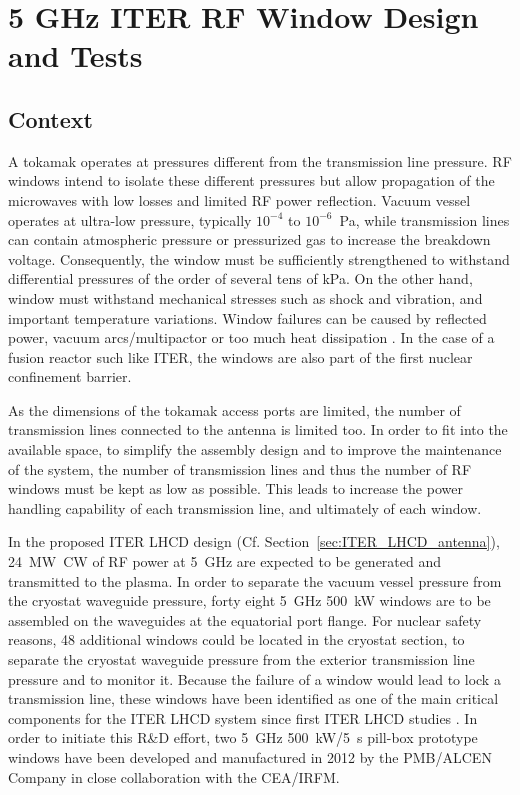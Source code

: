 \clearpage
\section[ITER RF Window]{5 GHz ITER RF Window Design and Tests}\label{sec:RF_windows}
\subsection{Context}
A tokamak operates at pressures different from the transmission line pressure. RF windows intend to isolate these different pressures but allow propagation of the microwaves with low losses and limited RF power reflection. Vacuum vessel operates at ultra-low pressure, typically $10^{-4}$ to $10^{-6}$~\si{Pa}, while transmission lines can contain atmospheric pressure or pressurized gas to increase the breakdown voltage. Consequently, the window must be sufficiently strengthened to withstand differential pressures of the order of several tens of \si{kPa}. On the other hand, window must withstand mechanical stresses such as shock and vibration, and important temperature variations. Window failures can be caused by reflected power, vacuum arcs/multipactor or too much heat dissipation . In the case of a fusion reactor such like ITER, the windows are also part of the first nuclear confinement barrier.

As the dimensions of the tokamak access ports are limited, the number of transmission lines connected to the antenna is limited too. In order to fit into the available space, to simplify the assembly design and to improve the maintenance of the system, the number of transmission lines and thus the number of RF windows must be kept as low as possible. This leads to increase the power handling capability of each transmission line, and ultimately of each window.

In the proposed ITER LHCD design (Cf. Section~\ref{sec:ITER_LHCD_antenna}), 24~\si{MW}~CW of RF power at 5~\si{GHz} are expected to be generated and transmitted to the plasma. In order to separate the vacuum vessel pressure from the cryostat waveguide pressure, forty eight 5~\si{GHz} 500~\si{kW} windows are to be assembled on the waveguides at the equatorial port flange. For nuclear safety reasons, 48 additional windows could be located in the cryostat section, to separate the cryostat waveguide pressure from the exterior transmission line pressure and to monitor it. Because the failure of a window would lead to lock a transmission line, these windows have been identified as one of the main critical components for the ITER LHCD system since first ITER LHCD studies . In order to initiate this R\&D effort, two 5~\si{GHz} 500~\si{kW}/5~s pill-box prototype windows have been developed and manufactured in 2012 by the PMB/ALCEN Company in close collaboration with the CEA/IRFM. 

